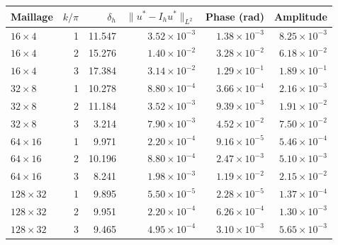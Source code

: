 \begin{tabular}{lrrrrr}
\toprule
Maillage & \(k/\pi\) & \(\delta_h\) & \(\|u^*-I_hu^*\|_{L^2}\) & Phase (rad) & Amplitude \\
\midrule
\(16\times4\) & 1 & 11.547 & \(3.52\times10^{-3}\) & \(1.38\times10^{-3}\) & \(8.25\times10^{-3}\) \\
\(16\times4\) & 2 & 15.276 & \(1.40\times10^{-2}\) & \(3.28\times10^{-2}\) & \(6.18\times10^{-2}\) \\
\(16\times4\) & 3 & 17.384 & \(3.14\times10^{-2}\) & \(1.29\times10^{-1}\) & \(1.89\times10^{-1}\) \\
\(32\times8\) & 1 & 10.278 & \(8.80\times10^{-4}\) & \(3.66\times10^{-4}\) & \(2.16\times10^{-3}\) \\
\(32\times8\) & 2 & 11.184 & \(3.52\times10^{-3}\) & \(9.39\times10^{-3}\) & \(1.91\times10^{-2}\) \\
\(32\times8\) & 3 & 3.214 & \(7.90\times10^{-3}\) & \(4.52\times10^{-2}\) & \(7.50\times10^{-2}\) \\
\(64\times16\) & 1 & 9.971 & \(2.20\times10^{-4}\) & \(9.16\times10^{-5}\) & \(5.46\times10^{-4}\) \\
\(64\times16\) & 2 & 10.196 & \(8.80\times10^{-4}\) & \(2.47\times10^{-3}\) & \(5.10\times10^{-3}\) \\
\(64\times16\) & 3 & 8.241 & \(1.98\times10^{-3}\) & \(1.19\times10^{-2}\) & \(2.15\times10^{-2}\) \\
\(128\times32\) & 1 & 9.895 & \(5.50\times10^{-5}\) & \(2.28\times10^{-5}\) & \(1.37\times10^{-4}\) \\
\(128\times32\) & 2 & 9.951 & \(2.20\times10^{-4}\) & \(6.26\times10^{-4}\) & \(1.30\times10^{-3}\) \\
\(128\times32\) & 3 & 9.465 & \(4.95\times10^{-4}\) & \(3.10\times10^{-3}\) & \(5.65\times10^{-3}\) \\
\bottomrule
\end{tabular}
